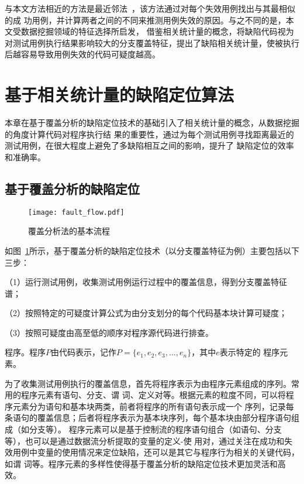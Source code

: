 与本文方法相近的方法是最近邻法~\cite{renieres2003fault}，该方法通过对每个失效用例找出与其最相似的成
功用例，并计算两者之间的不同来推测用例失效的原因。与之不同的是，本文受数据挖掘领域的特征选择所启发，
借鉴相关统计量的概念，将缺陷代码视为对测试用例执行结果影响较大的分支覆盖特征，提出了缺陷相关统计量，使被执行
后越容易导致用例失效的代码可疑度越高。

\section{基于相关统计量的缺陷定位算法}
本章在基于覆盖分析的缺陷定位技术的基础引入了相关统计量的概念，从数据挖掘的角度计算代码对程序执行结
果的重要性，通过为每个测试用例寻找距离最近的测试用例，在很大程度上避免了多缺陷相互之间的影响，提升了
缺陷定位的效率和准确率。

\subsection{基于覆盖分析的缺陷定位}
\begin{figure}[htp]
      \centering
      \texttt{[image: fault\_flow.pdf]}
      \caption{覆盖分析法的基本流程}
      \label{fig:fault_flow}
\end{figure}

如图~\ref{fig:fault_flow}所示，基于覆盖分析的缺陷定位技术（以分支覆盖特征为例）主要包括以下三步：

（1）运行测试用例，收集测试用例运行过程中的覆盖信息，得到分支覆盖特征谱；

（2）按照特定的可疑度计算公式为由分支划分的每个代码基本块计算可疑度；

（3）按照可疑度由高至低的顺序对程序源代码进行排查。 

\begin{Definition}
      程序。程序$P$由代码表示，记作$P=\{e_1, e_2, e_3, ..., e_n\}$，其中$e$表示特定的
      程序元素。
\end{Definition}

为了收集测试用例执行的覆盖信息，首先将程序表示为由程序元素组成的序列。常用的程序元素有语句、分支、谓
词、定义对等。根据元素的粒度不同，可以将程序元素分为语句和基本块两类，前者将程序的所有语句表示成一个
序列，记录每条语句的覆盖信息；后者将程序表示为基本块序列，每个基本块由部分程序语句组成（如分支等）。
程序元素可以是基于控制流的程序语句组合（如语句、分支等），也可以是通过数据流分析提取的变量的定义-使
用对，通过关注在成功和失效用例中变量的使用情况来定位缺陷，还可以是其它与程序行为相关的关键代码，如谓
词等。程序元素的多样性使得基于覆盖分析的缺陷定位技术更加灵活和高效。

